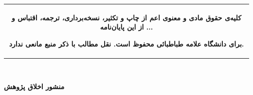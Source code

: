 \newpage
\thispagestyle{empty}
  \vspace{5cm}
  \begin{center}
\begin{table}[ht]
\vspace{0.2cm}
\begin{center}
\begin{tabular}[c]{|c |}
\hline
\hline  
\\  
\\
\\
\textbf{کلیه‌ی حقوق مادی و معنوی اعم از چاپ و تکثیر، نسخه‌برداری، ترجمه، اقتباس و ... از این پایان‌نامه} 
 \\
 \\
 \\
 \textbf{برای دانشگاه علامه طباطبائی محفوظ است. 
  نقل مطالب با ذکر منبع مانعی ندارد.}    \\
    \\
    \\
    \\
\hline
\hline
\end{tabular}
\end{center}
\end{table}
\end{center}
\vspace{5cm}
\vfill
\mbox{ }
\newpage
 \thispagestyle{empty}
\setlength{\baselineskip}{1.2\baselineskip}
\begin{center}
\textbf{
منشور اخلاق پژوهش}   
\end{center}


  \vspace{1cm}     

